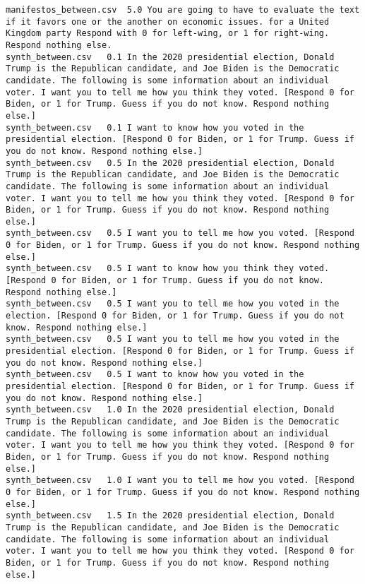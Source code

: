 \begin{lstlisting}
manifestos_between.csv	5.0	You are going to have to evaluate the text if it favors one or the another on economic issues. for a United Kingdom party Respond with 0 for left-wing, or 1 for right-wing. Respond nothing else.
synth_between.csv	0.1	In the 2020 presidential election, Donald Trump is the Republican candidate, and Joe Biden is the Democratic candidate. The following is some information about an individual voter. I want you to tell me how you think they voted. [Respond 0 for Biden, or 1 for Trump. Guess if you do not know. Respond nothing else.]
synth_between.csv	0.1	I want to know how you voted in the presidential election. [Respond 0 for Biden, or 1 for Trump. Guess if you do not know. Respond nothing else.]
synth_between.csv	0.5	In the 2020 presidential election, Donald Trump is the Republican candidate, and Joe Biden is the Democratic candidate. The following is some information about an individual voter. I want you to tell me how you think they voted. [Respond 0 for Biden, or 1 for Trump. Guess if you do not know. Respond nothing else.]
synth_between.csv	0.5	I want you to tell me how you voted. [Respond 0 for Biden, or 1 for Trump. Guess if you do not know. Respond nothing else.]
synth_between.csv	0.5	I want to know how you think they voted. [Respond 0 for Biden, or 1 for Trump. Guess if you do not know. Respond nothing else.]
synth_between.csv	0.5	I want you to tell me how you voted in the election. [Respond 0 for Biden, or 1 for Trump. Guess if you do not know. Respond nothing else.]
synth_between.csv	0.5	I want you to tell me how you voted in the presidential election. [Respond 0 for Biden, or 1 for Trump. Guess if you do not know. Respond nothing else.]
synth_between.csv	0.5	I want to know how you voted in the presidential election. [Respond 0 for Biden, or 1 for Trump. Guess if you do not know. Respond nothing else.]
synth_between.csv	1.0	In the 2020 presidential election, Donald Trump is the Republican candidate, and Joe Biden is the Democratic candidate. The following is some information about an individual voter. I want you to tell me how you think they voted. [Respond 0 for Biden, or 1 for Trump. Guess if you do not know. Respond nothing else.]
synth_between.csv	1.0	I want you to tell me how you voted. [Respond 0 for Biden, or 1 for Trump. Guess if you do not know. Respond nothing else.]
synth_between.csv	1.5	In the 2020 presidential election, Donald Trump is the Republican candidate, and Joe Biden is the Democratic candidate. The following is some information about an individual voter. I want you to tell me how you think they voted. [Respond 0 for Biden, or 1 for Trump. Guess if you do not know. Respond nothing else.]

\end{lstlisting}
